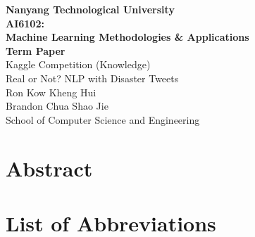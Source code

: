 \documentclass[11pt]{report}
\begin{document}


\begin{center}	
\textbf{\LARGE{Nanyang Technological University}} 
\\[5cm]		
\Large{ }			
\textbf{\LARGE{AI6102: }}
\\
\textbf{\LARGE{Machine Learning Methodologies \& Applications}}
\\
\textbf{\LARGE{Term Paper}}
\\[2cm]
{\LARGE{Kaggle Competition (Knowledge)}}
\\
{\LARGE{Real or Not? NLP with Disaster Tweets}}
\\[2cm]
{\Large{Ron Kow Kheng Hui}}
\\
{\Large{Brandon Chua Shao Jie}}
\\
{\Large{School of Computer Science and Engineering}}
\end{center}









\chapter*{Abstract}


\tableofcontents

{}
\listoftables


{}
\listoffigures

{}
\chapter*{{List of Abbreviations}}
\end{document}
